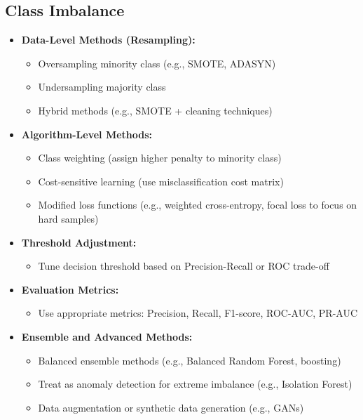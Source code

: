 \documentclass[10pt,a4paper]{article}
\begin{document}
	\subsection{Class Imbalance}
	\begin{itemize}
		\item \textbf{Data-Level Methods (Resampling):}
		\begin{itemize}
			\item Oversampling minority class (e.g., SMOTE, ADASYN)
			\item Undersampling majority class
			\item Hybrid methods (e.g., SMOTE + cleaning techniques)
		\end{itemize}

		\item \textbf{Algorithm-Level Methods:}
		\begin{itemize}
			\item Class weighting (assign higher penalty to minority class)
			\item Cost-sensitive learning (use misclassification cost matrix)
			\item Modified loss functions (e.g., weighted cross-entropy, focal loss to focus on hard samples)
		\end{itemize}

		\item \textbf{Threshold Adjustment:}
		\begin{itemize}
			\item Tune decision threshold based on Precision-Recall or ROC trade-off
		\end{itemize}

		\item \textbf{Evaluation Metrics:}
		\begin{itemize}
			\item Use appropriate metrics: Precision, Recall, F1-score, ROC-AUC, PR-AUC
		\end{itemize}

		\item \textbf{Ensemble and Advanced Methods:}
		\begin{itemize}
			\item Balanced ensemble methods (e.g., Balanced Random Forest, boosting)
			\item Treat as anomaly detection for extreme imbalance (e.g., Isolation Forest)
			\item Data augmentation or synthetic data generation (e.g., GANs)
		\end{itemize}
	\end{itemize}
\end{document}
